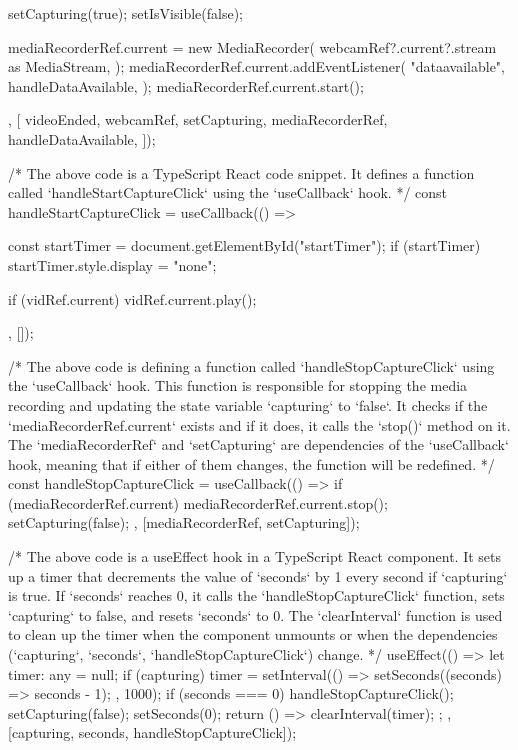 {{{      setCapturing(true);
      setIsVisible(false);

      mediaRecorderRef.current = new MediaRecorder(
        webcamRef?.current?.stream as MediaStream,
      );
      mediaRecorderRef.current.addEventListener(
        "dataavailable",
        handleDataAvailable,
      );
      mediaRecorderRef.current.start();
    }
  }, [
    videoEnded,
    webcamRef,
    setCapturing,
    mediaRecorderRef,
    handleDataAvailable,
  ]);

  /* The above code is a TypeScript React code snippet. It defines a function called
`handleStartCaptureClick` using the `useCallback` hook. */
  const handleStartCaptureClick = useCallback(() => {
    const startTimer = document.getElementById("startTimer");
    if (startTimer) {
      startTimer.style.display = "none";
    }

    if (vidRef.current) {
      vidRef.current.play();
    }
  }, []);

  /* The above code is defining a function called `handleStopCaptureClick` using the `useCallback` hook.
This function is responsible for stopping the media recording and updating the state variable
`capturing` to `false`. It checks if the `mediaRecorderRef.current` exists and if it does, it calls
the `stop()` method on it. The `mediaRecorderRef` and `setCapturing` are dependencies of the
`useCallback` hook, meaning that if either of them changes, the function will be redefined. */
  const handleStopCaptureClick = useCallback(() => {
    if (mediaRecorderRef.current) {
      mediaRecorderRef.current.stop();
    }
    setCapturing(false);
  }, [mediaRecorderRef, setCapturing]);

  /* The above code is a useEffect hook in a TypeScript React component. It sets up a timer that
decrements the value of `seconds` by 1 every second if `capturing` is true. If `seconds` reaches 0,
it calls the `handleStopCaptureClick` function, sets `capturing` to false, and resets `seconds` to
0. The `clearInterval` function is used to clean up the timer when the component unmounts or when
the dependencies (`capturing`, `seconds`, `handleStopCaptureClick`) change. */
  useEffect(() => {
    let timer: any = null;
    if (capturing) {
      timer = setInterval(() => {
        setSeconds((seconds) => seconds - 1);
      }, 1000);
      if (seconds === 0) {
        handleStopCaptureClick();
        setCapturing(false);
        setSeconds(0);
      }
    }
    return () => {
      clearInterval(timer);
    };
  }, [capturing, seconds, handleStopCaptureClick]);

}
